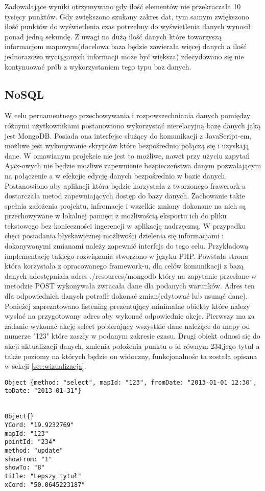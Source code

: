 Zadowalające wyniki otrzymywano gdy ilość elementów nie przekraczała 10 tysięcy punktów. Gdy zwiększono szukany zakres dat, tym samym zwiększono ilość punktów do wyświetlenia czas potrzebny do wyświetlenia danych wynosił ponad jedną sekundę. Z uwagi na dużą ilość danych które towarzyszą informacjom mapowym(docelowa baza będzie zawierała więcej danych a ilość jednorazowo wyciąganych informacji może być większa) zdecydowano się nie kontynuować prób z wykorzystaniem tego typu baz danych.

\subsection{NoSQL}
\label{sec:nosql}

W celu pernamentnego przechowywania i rozpowszechniania danych pomiędzy różnymi użytkownikami postanowiono wykorzystać nierelacyjną bazę danych jaką jest MongoDB. Posiada ona interfejsc służący do komunikacji z JavaScript-em, możliwe jest wykonywanie skryptów które bezpośrednio połączą się i uzyskają dane\cite{mongojs}. W omawianym projekcie nie jest to możliwe, nawet przy użyciu zapytań Ajax-owych nie będzie możliwe zapewnienie bezpieczeństwa danym pozwalającym na połączenie a w efekcjie edycję danych bezpośrednio w bazie danych.
Postanowiono aby aplikacji która będzie korzystała z tworzonego frawerork-a dostarczała metod zapewniających dostęp do bazy danych. Zachowanie takie spełnia założenia projektu, infromacje i wszelkie zmiany dokonane na nich są przechowywane w lokalnej pamięci z możliwością eksportu ich do pliku tekstowego bez konieczności ingerencji w aplikację nadrzęczną. W przypadku chęci posiadania błyskawicznej możliwości dzielenia się informacjami i dokonywanymi zmianami należy zapewnić interfejs do tego celu. Przykładową implementację takiego rozwiązania stworzono w języku PHP. Powstała strona która korzystała z opracowanego framework-u, dla celów komunikacji z bazą danych udostępniała adres ./resources/mongodb który na zapytanie przesłane w metodzie POST wykonywała zwracała dane dla podanych warunków. Adres ten dla odpowiednich danych potrafił dokonać zmian(edytować lub usunąć dane).
Ponieżej zaprezntowano listening prezentujący minimalne obiekty które nalezy wysłać na przygotowany adres aby wykonać odpowiednie akcje. Pierwszy ma za zadanie wykonać akcję select pobierający wszystkie dane należące do mapy od numerze "123" które zaszły w podanym zakresie czasu. Drugi obiekt odnosi się do akcji aktualizacji danych, zmienia położenia punktu o id równym 234,jego tytuł a także poziomy na których będzie on widoczny, funkcjonalnośc ta została opisana w sekcji  \ref{sec:wizualizacja}.

\lstset{language=JavaScript}
\begin{lstlisting}[caption=caption2]
Object {method: "select", mapId: "123", fromDate: "2013-01-01 12:30", toDate: "2013-01-31"}


Object{}
YCord: "19.9232769"
mapId: "123"
pointId: "234"
method: "update"
showFrom: "1"
showTo: "8"
title: "Lepszy tytuł"
xCord: "50.0645223187"

\end{lstlisting}




